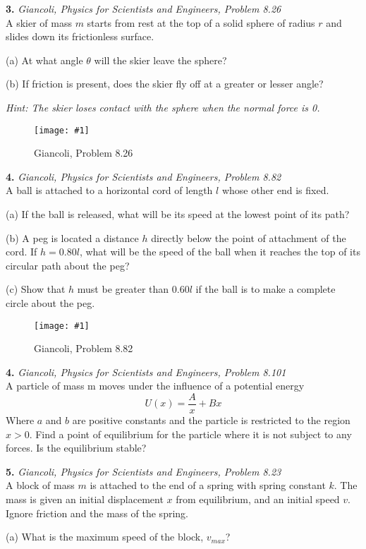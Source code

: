 \documentclass[11pt]{article}
\newcommand{\fig}[4]{
    \begin{figure}[H]
        \centering
        \texttt{[image: \#1]}
        \caption{#2}
        \label{exp4fit}
    \end{figure}
}
\theoremstyle{gangnamstyle}{\newtheorem{definition}{Definition}[]}
\theoremstyle{gangnamstyle}{\newtheorem{example}{Example}[]}
\theoremstyle{gangnamstyle}{\newtheorem{problem}{Problem}[]}
\begin{document}
\pagebreak

\textbf{3.} \textit{Giancoli, Physics for Scientists and Engineers, Problem 8.26} \\
A skier of mass $m$ starts from rest at the top of a solid sphere of radius $r$ and slides down its frictionless surface.

(a) At what angle $\theta$ will the skier leave the sphere? 

(b) If friction is present, does the skier fly off at a greater or lesser angle? 

\textit{Hint: The skier loses contact with the sphere when the normal force is 0. }
\fig{figs/0715/g826.png}{Giancoli, Problem 8.26}{0.35}{0}

\pagebreak

\textbf{4.} \textit{Giancoli, Physics for Scientists and Engineers, Problem 8.82} \\
A ball is attached to a horizontal cord of length $l$ whose other end is fixed. 

(a) If the ball is released, what will be its speed at the lowest point of its path? 

(b) A peg is located a distance $h$ directly below the point of attachment of the cord. If $h = 0.80 l$, what will be the speed of the ball when it reaches the top of its circular path about the peg?

(c) Show that $h$ must be greater than $0.60 l$ if the ball is to make a complete circle about the peg.
\fig{figs/0715/g845.png}{Giancoli, Problem 8.82}{0.55}{0}

\pagebreak

\textbf{4.} \textit{Giancoli, Physics for Scientists and Engineers, Problem 8.101} \\
A particle of mass m moves under the influence of a potential
energy
\[ U(x) = \frac{A}{x} + Bx \]
Where $a$ and $b$ are positive constants and the particle is restricted to the region $x > 0$. Find a point of equilibrium for the particle where it is not subject to any forces. Is the equilibrium stable? 

\pagebreak

\textbf{5.} \textit{Giancoli, Physics for Scientists and Engineers, Problem 8.23} \\
A block of mass $m$ is attached to the end of a spring with spring constant $k$. The mass is given an initial displacement $x$ from equilibrium, and an initial speed $v$. Ignore friction and the mass of the spring. 

(a) What is the maximum speed of the block, $v_{max}$? 
\end{document}
